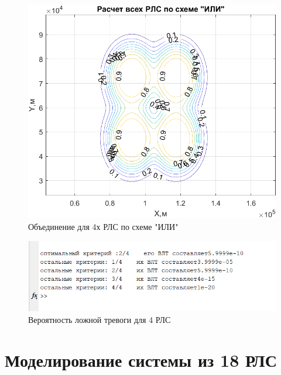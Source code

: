 \begin{figure}
    \centering
    \includegraphics{figures/OR_RLS_4.png}
    \caption{Объединение для 4х РЛС по схеме "ИЛИ"}
    \label{fig:my_label}
\end{figure}

\begin{figure}
    \centering
    \includegraphics[scale = 0.7]{figures/VLT_4.png}
    \caption{Вероятность ложной тревоги для 4 РЛС}
    \label{fig:my_label}
\end{figure}

\section{Моделирование системы из 18 РЛС}

